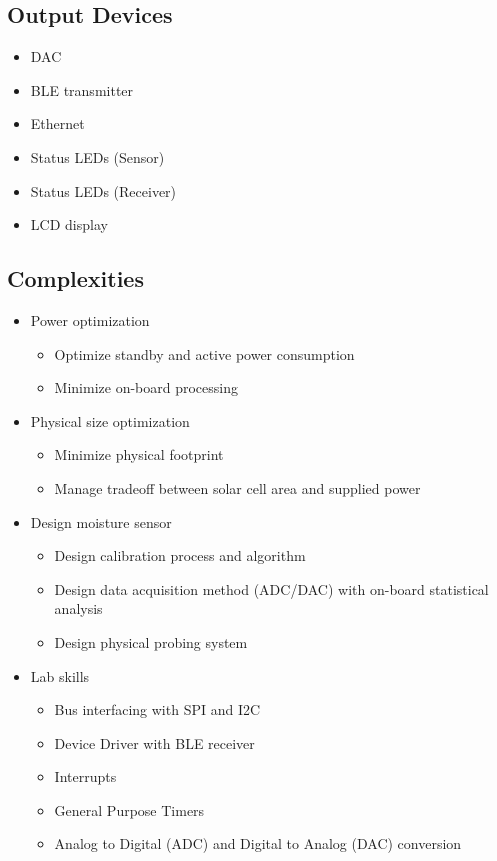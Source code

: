 \documentclass{article}
\begin{document}
\subsection{Output Devices}
\begin{itemize}
	\item DAC
    \item BLE transmitter
	\item Ethernet
	\item Status LEDs (Sensor)
	\item Status LEDs (Receiver)
	\item LCD display
\end{itemize}

\subsection{Complexities}
\begin{itemize}
    \item Power optimization
        \begin{itemize}
            \item Optimize standby and active power consumption
            \item Minimize on-board processing
        \end{itemize}
    \item Physical size optimization
        \begin{itemize}
            \item Minimize physical footprint
            \item Manage tradeoff between solar cell area and supplied power
        \end{itemize}
    \item Design moisture sensor
        \begin{itemize}
            \item Design calibration process and algorithm
            \item Design data acquisition method (ADC/DAC) with on-board
                statistical analysis
            \item Design physical probing system
        \end{itemize}
    \item Lab skills
        \begin{itemize}
            \item Bus interfacing with SPI and I2C
            \item Device Driver with BLE receiver
            \item Interrupts
            \item General Purpose Timers
            \item Analog to Digital (ADC) and Digital to Analog (DAC)
                conversion
        \end{itemize}
\end{itemize}
\end{document}
